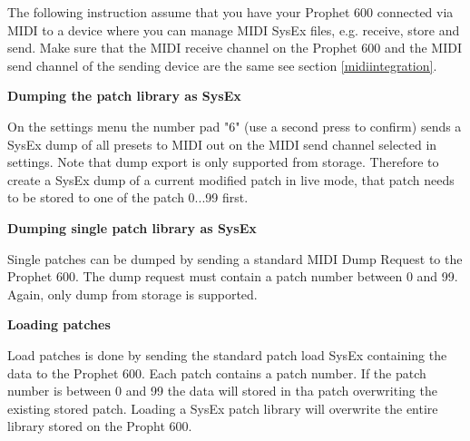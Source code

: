 
The following instruction assume that you have your Prophet 600 connected via MIDI to a device where you can manage MIDI SysEx files, e.g. receive, store and send. Make sure that the MIDI receive channel on the Prophet 600 and the MIDI send channel of the sending device are the same see section \ref{midiintegration}.

\textbf{Dumping the patch library as SysEx} 

On the settings menu the number pad "6" (use a second press to confirm) sends a SysEx dump of all presets to MIDI out on the MIDI send channel selected in settings. Note that dump export is only supported from storage. Therefore to create a SysEx dump of a current modified patch in live mode, that patch needs to be stored to one of the patch 0...99 first.

\textbf{Dumping single patch library as SysEx} 

Single patches can be dumped by sending a standard MIDI Dump Request to the Prophet 600. The dump request must contain a patch number between 0 and 99. Again, only dump from storage is supported. 

\textbf{Loading patches} 

Load patches is done by sending the standard patch load SysEx containing the data to the Prophet 600. Each patch contains a patch number. If the patch number is  between 0 and 99 the data will stored in tha patch overwriting the existing stored patch. Loading a SysEx patch library will overwrite the entire library stored on the Propht 600.
